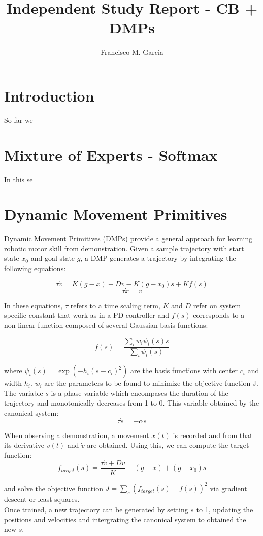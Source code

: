 \documentclass[a4paper]{article}
\begin{document}
\title{Independent Study Report - CB + DMPs}
\author{Francisco M. Garcia}

\maketitle


\section{Introduction}

So far we 

\section{Mixture of Experts - Softmax}

In this se

\section{Dynamic Movement Primitives}

Dynamic Movement Primitives (DMPs) provide a general approach for learning robotic motor skill from demonstration. Given a sample trajectory with start state $x_0$ and goal state $g$, a DMP generates a trajectory by integrating the following equations:

$$
\tau \dot{v} = K(g - x) - Dv - K(g - x_0) s + Kf(s)
$$
$$
\tau \dot{x} = v
$$

In these equations, $\tau$ refers to a time scaling term, $K$ and $D$ refer on system specific constant that work as in a PD controller and $f(s)$ corresponds to a non-linear function composed of several Gaussian basis functions:

$$
f(s) = \frac{\sum_i w_i \psi_i(s) s }{\sum_i \psi_i(s)}
$$

where $\psi_i(s) = \exp(-h_i(s-c_i)^2)$ are the basis functions with center $c_i$ and width $h_i$. $w_i$ are the parameters to be found to minimize the objective function J. \\
\indent The variable $s$ is a phase variable which encompases the duration of the trajectory and monotonically decreases from 1 to 0. This variable obtained by the canonical system:
$$
\tau \dot{s} = -\alpha s
$$
 
When observing a demonstration, a movement $x(t)$ is recorded and from that its derivative $v(t)$ and $\dot{v}$ are obtained. Using this, we can compute the target function:
$$
f_{target}(s) = \frac{\tau \dot{v} + Dv}{K} - (g - x) + (g - x_0) s
$$ 

and solve the objective function $J = \sum_s (f_{target}(s) - f(s))^2$ via gradient descent or least-squares. \\
\indent Once trained, a new trajectory can be generated by setting $s$ to 1, updating the positions and velocities and intergrating the canonical system to obtained the new $s$.
 
 
 
\end{document}
